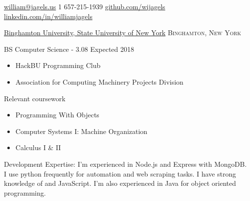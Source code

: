 \documentclass[11pt]{article}
\begin{document}
\sloppy  %



\nobreakvspace{0.3em}  %

\noindent\href{mailto:william@jagels.us}{william\mbox{}@\mbox{}jagels.us}\sbull
\textsmaller{+}1 657-215-1939\sbull
\href{https://github.com/wijagels}{github.com/wijagels}\sbull
\href{https://www.linkedin.com/in/williamjagels}{linkedin.com/in/williamjagels}



\spacedhrule{0.1em}{0.9em}  %

\headedsection
  {\href{http://www.binghamton.edu/index.php}{Binghamton University, State University of New York}}
  {\textsc{Binghamton, New York}} {
  \headedsubsection
    {BS Computer Science -  3.08}
    {Expected 2018}
    {\bodytext
  {
    \begin{itemize}
      \item HackBU Programming Club
      \item Association for Computing Machinery Projects Division
    \end{itemize}
    Relevant coursework
    \begin{itemize}
	\item Programming With Objects
	\item Computer Systems I: Machine Organization
	\item Calculus I \& II
    \end{itemize}
  }
    }
}



\spacedhrule{0.1em}{0.9em}  %

\inlineheadsection  %
  {Development Expertise:}
  {  I'm experienced in Node.js and Express with MongoDB.  I use python frequently for automation and web scraping tasks.  I have strong knowledge of  and JavaScript.  I'm also experienced in Java for object oriented programming.}
\end{document}
